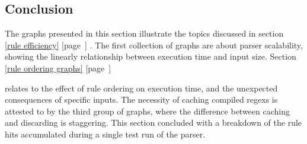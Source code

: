 \documentclass[a4paper,12pt,draft]{article}
\newcommand{\refwithpage}[1]{%
    \empty{}\ref{#1} [page~\pageref{#1}]%
}
\begin{document}
\clearpage

\subsection{Conclusion}

The graphs presented in this section illustrate the topics discussed in
section~\refwithpage{rule efficiency}.  The first collection of graphs are
about parser scalability, showing the linearly relationship between
execution time and input size.  Section~\refwithpage{rule ordering graphs}
relates to the effect of rule ordering on execution time, and the
unexpected consequences of specific inputs.  The necessity of caching
compiled regexs is attested to by the third group of graphs, where the
difference between caching and discarding is staggering.  This section
concluded with a breakdown of the rule hits accumulated during a single
test run of the parser.


\printglossary{}
\printacronym{}
\end{document}

